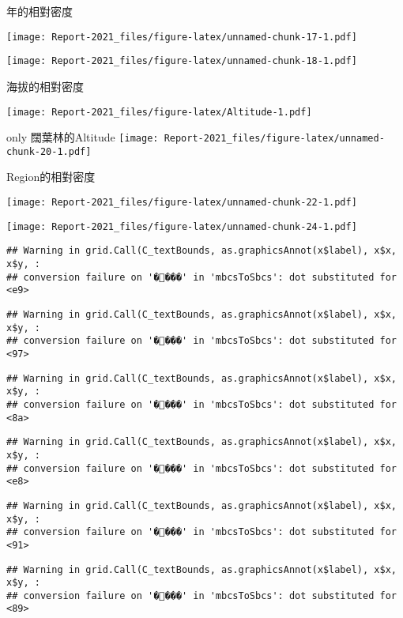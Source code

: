 \documentclass[
]{article}
\begin{document}
\newpage

年的相對密度

\texttt{[image: Report-2021\_files/figure-latex/unnamed-chunk-17-1.pdf]}

\texttt{[image: Report-2021\_files/figure-latex/unnamed-chunk-18-1.pdf]}

海拔的相對密度

\texttt{[image: Report-2021\_files/figure-latex/Altitude-1.pdf]}

only 闊葉林的Altitude
\texttt{[image: Report-2021\_files/figure-latex/unnamed-chunk-20-1.pdf]}

Region的相對密度

\texttt{[image: Report-2021\_files/figure-latex/unnamed-chunk-22-1.pdf]}

\texttt{[image: Report-2021\_files/figure-latex/unnamed-chunk-24-1.pdf]}

\begin{verbatim}
## Warning in grid.Call(C_textBounds, as.graphicsAnnot(x$label), x$x, x$y, :
## conversion failure on '����' in 'mbcsToSbcs': dot substituted for <e9>
\end{verbatim}

\begin{verbatim}
## Warning in grid.Call(C_textBounds, as.graphicsAnnot(x$label), x$x, x$y, :
## conversion failure on '����' in 'mbcsToSbcs': dot substituted for <97>
\end{verbatim}

\begin{verbatim}
## Warning in grid.Call(C_textBounds, as.graphicsAnnot(x$label), x$x, x$y, :
## conversion failure on '����' in 'mbcsToSbcs': dot substituted for <8a>
\end{verbatim}

\begin{verbatim}
## Warning in grid.Call(C_textBounds, as.graphicsAnnot(x$label), x$x, x$y, :
## conversion failure on '����' in 'mbcsToSbcs': dot substituted for <e8>
\end{verbatim}

\begin{verbatim}
## Warning in grid.Call(C_textBounds, as.graphicsAnnot(x$label), x$x, x$y, :
## conversion failure on '����' in 'mbcsToSbcs': dot substituted for <91>
\end{verbatim}

\begin{verbatim}
## Warning in grid.Call(C_textBounds, as.graphicsAnnot(x$label), x$x, x$y, :
## conversion failure on '����' in 'mbcsToSbcs': dot substituted for <89>
\end{verbatim}
\end{document}

